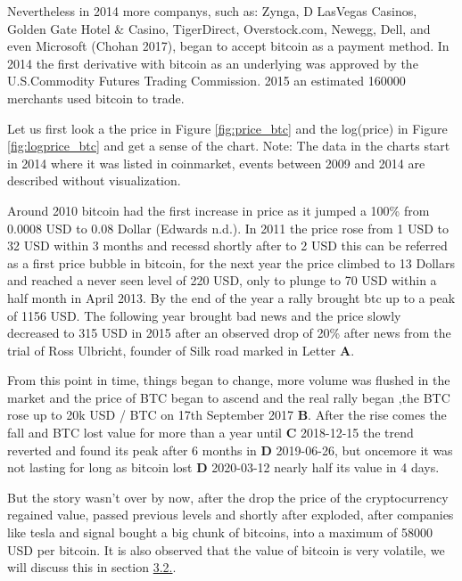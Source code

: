 \documentclass[
]{article}
\begin{document}
Nevertheless in 2014 more companys, such as: Zynga, D LasVegas Casinos,
Golden Gate Hotel \& Casino, TigerDirect, Overstock.com, Newegg, Dell,
and even Microsoft (Chohan 2017), began to accept bitcoin as a payment
method. In 2014 the first derivative with bitcoin as an underlying was
approved by the U.S.Commodity Futures Trading Commission. 2015 an
estimated 160000 merchants used bitcoin to trade.

Let us first look a the price in Figure \ref{fig:price_btc} and the
log(price) in Figure \ref{fig:logprice_btc} and get a sense of the
chart. Note: The data in the charts start in 2014 where it was listed in
coinmarket, events between 2009 and 2014 are described without
visualization.

Around 2010 bitcoin had the first increase in price as it jumped a 100\%
from 0.0008 USD to 0.08 Dollar (Edwards n.d.). In 2011 the price rose
from 1 USD to 32 USD within 3 months and recessd shortly after to 2 USD
this can be referred as a first price bubble in bitcoin, for the next
year the price climbed to 13 Dollars and reached a never seen level of
220 USD, only to plunge to 70 USD within a half month in April 2013. By
the end of the year a rally brought btc up to a peak of 1156 USD. The
following year brought bad news and the price slowly decreased to 315
USD in 2015 after an observed drop of 20\% after news from the trial of
Ross Ulbricht, founder of Silk road marked in Letter \textbf{A}.

From this point in time, things began to change, more volume was flushed
in the market and the price of BTC began to ascend and the real rally
began ,the BTC rose up to 20k USD / BTC on 17th September 2017
\textbf{B}. After the rise comes the fall and BTC lost value for more
than a year until \textbf{C} 2018-12-15 the trend reverted and found its
peak after 6 months in \textbf{D} 2019-06-26, but oncemore it was not
lasting for long as bitcoin lost \textbf{D} 2020-03-12 nearly half its
value in 4 days.

But the story wasn't over by now, after the drop the price of the
cryptocurrency regained value, passed previous levels and shortly after
exploded, after companies like tesla and signal bought a big chunk of
bitcoins, into a maximum of 58000 USD per bitcoin. It is also observed
that the value of bitcoin is very volatile, we will discuss this in
section \protect\hyperlink{data_exploration}{3.2.}.

\newpage
\end{document}
